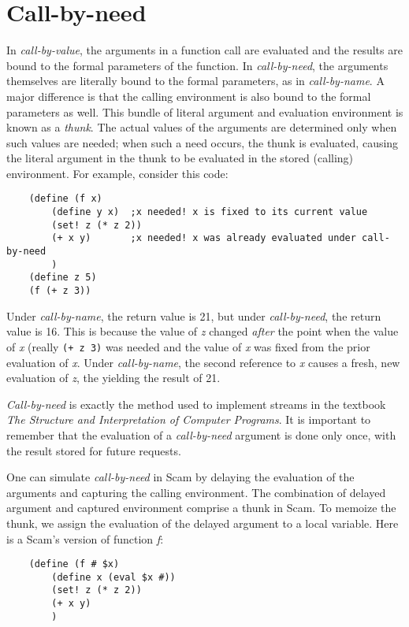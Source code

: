 \section*{Call-by-need}

In {\it call-by-value}, the arguments in a function call are evaluated and
the results are bound to the formal parameters of the function. In
{\it call-by-need}, the arguments themselves are literally bound
to the formal
parameters, as in {\it call-by-name}. A major difference is
that the calling environment is also bound to the formal
parameters as well. This bundle of literal argument and 
evaluation environment is known as a {\it thunk}.
The actual values of the arguments
are determined only when such values are
needed; when such a need occurs, the thunk is
evaluated, causing the literal argument
in the thunk to be
evaluated in the stored (calling) environment.
For example, consider this code:

\begin{verbatim}
    (define (f x)
        (define y x)  ;x needed! x is fixed to its current value
        (set! z (* z 2))
        (+ x y)       ;x needed! x was already evaluated under call-by-need
        )
    (define z 5)
    (f (+ z 3)) 
\end{verbatim}

Under {\it call-by-name}, the return value is 21, but under
{\it call-by-need}, the return value is 16.
This is because the
value of {\it z} changed {\it after} the point when the value of {\it x}
(really \verb!(+ z 3)! was needed and the value of {\it x} was fixed from
the prior evaluation of {\it x}. Under {\it call-by-name}, the second
reference to {\it x} causes a fresh, new evaluation of {\it z},
the yielding the result of 21.

{\it Call-by-need}
is exactly the method used to implement streams in the 
textbook
{\it The Structure and Interpretation of Computer Programs}.
It is important to remember that the evaluation of a
{\it call-by-need} argument is done only once, 
with the result stored for future requests.

One can simulate {\it call-by-need} in Scam by delaying the
evaluation of the arguments and capturing the calling
environment. The combination of delayed argument and
captured environment comprise a thunk in Scam. To memoize
the thunk, we assign the evaluation of the delayed argument
to a local variable. Here is a Scam's version of function {\it f}:

\begin{verbatim}
    (define (f # $x)
        (define x (eval $x #))
        (set! z (* z 2))
        (+ x y)
        )
\end{verbatim}

